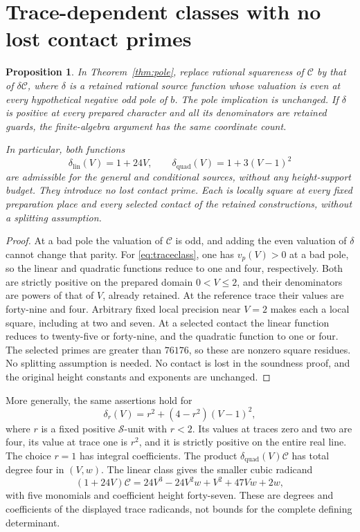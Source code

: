 \documentclass[11pt,a4paper]{article}
\newtheorem{proposition}[theorem]{Proposition}
\begin{document}
\section{Trace-dependent classes with no lost contact primes}

\begin{proposition}\label{prop:class}
In Theorem~\ref{thm:pole}, replace rational squareness of
\(\mathcal C\) by that of \(\delta\mathcal C\), where \(\delta\)
is a retained rational source function whose valuation is even at every
hypothetical negative odd pole of \(b\). The pole implication is
unchanged. If \(\delta\) is positive at every prepared character
and all its denominators are retained guards, the finite-algebra
argument has the same coordinate count.

In particular, both functions
\begin{equation}\label{eq:traceclass}
       \delta_{\mathrm{lin}}(V)=1+24V,\qquad
       \delta_{\mathrm{quad}}(V)=1+3(V-1)^2
\end{equation}
are admissible for the general and conditional sources, without any
height-support budget. They introduce no lost contact prime. Each is
locally square at every fixed preparation place and every selected
contact of the retained constructions, without a splitting assumption.
\end{proposition}
\begin{proof}
At a bad pole the valuation of \(\mathcal C\) is odd, and adding
the even valuation of \(\delta\) cannot change that parity.
For \eqref{eq:traceclass}, one has \(v_p(V)>0\) at a bad pole,
so the linear and quadratic functions reduce to one and four,
respectively. Both are strictly positive on the prepared domain
\(0<V\le2\), and their denominators are powers of that of \(V\),
already retained. At the reference trace their values are forty-nine
and four. Arbitrary fixed local precision near \(V=2\) makes each
a local square, including at two and seven.
At a selected contact the linear function reduces to twenty-five or
forty-nine, and the quadratic function to one or four. The selected
primes are greater than \(76176\), so these are nonzero square
residues. No splitting assumption is needed. No contact is lost in the
soundness proof, and the original height constants and exponents
are unchanged.
\end{proof}

More generally, the same assertions hold for
\[
          \delta_r(V)=r^2+(4-r^2)(V-1)^2,
\]
where \(r\) is a fixed positive \(\mathcal S\)-unit with \(r<2\).
Its values at traces zero and two are four, its value at trace one is
\(r^2\), and it is strictly positive on the entire real line.
The choice \(r=1\) has integral coefficients. The product
\(\delta_{\mathrm{quad}}(V)\mathcal C\) has total degree four in
\((V,w)\). The linear class gives the smaller cubic radicand
\begin{equation}\label{eq:cubic}
 (1+24V)\mathcal C
 =24V^3-24V^2w+V^2+47Vw+2w,
\end{equation}
with five monomials and coefficient height forty-seven. These are
degrees and coefficients of the displayed trace radicands, not bounds
for the complete defining determinant.
\end{document}
